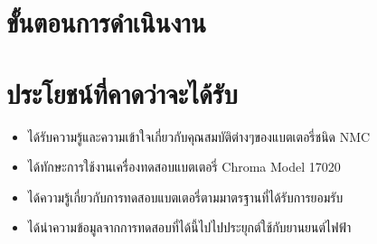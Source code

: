 \section{ขั้นตอนการดำเนินงาน}
\section{ประโยชน์ที่คาดว่าจะได้รับ}
\begin{itemize}
  \item ได้รับความรู้และความเข้าใจเกี่ยวกับคุณสมบัติต่างๆของแบตเตอรี่ชนิด NMC
  \item ได้ทักษะการใช้งานเครื่องทดสอบแบตเตอรี่ Chroma Model 17020
  \item ได้ความรู้เกี่ยวกับการทดสอบแบตเตอรี่ตามมาตรฐานที่ได้รับการยอมรับ
  \item ได้นำความข้อมูลจากการทดสอบที่ได้นี้ไปไปประยุกต์ใช้กับยานยนต์ไฟฟ้า
\end{itemize}


